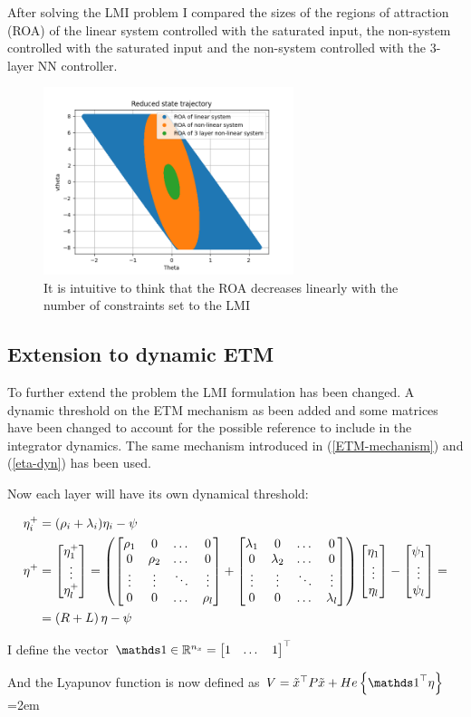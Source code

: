 \documentclass{article}
\begin{document}
After solving the LMI problem I compared the sizes of the regions of attraction (ROA) of the linear system controlled with the saturated input, the non-system controlled with the saturated input and the non-system controlled with the 3-layer NN controller. 


\begin{figure}[H]
    \centering
    \includegraphics[width=0.65\textwidth]{ROA_comparison}
    \caption{It is intuitive to think that the ROA decreases linearly with the number of constraints set to the LMI}
\end{figure}

\subsection*{Extension to dynamic ETM}
To further extend the problem the LMI formulation has been changed. A dynamic threshold on the ETM mechanism as been added and some matrices have been changed to account for the possible reference to include in the integrator dynamics. 
The same mechanism introduced in (\ref{ETM-mechanism}) and (\ref{eta-dyn}) has been used. 

Now each layer will have its own dynamical threshold:

\begin{align*}
  \eta_i^{+} &= (\rho_{i} + \lambda_{i}) \eta_i - \psi \\
  \eta^{+} &= \left[\begin{matrix}
    \eta_1^{+} \\
    \vdots \\
    \eta_l^{+}
  \end{matrix}\right] = \left( \left[\begin{matrix}
    \rho_1 & 0 & \dots & 0\\
    0 & \rho_2 & \dots & 0\\
    \vdots & \vdots & \ddots & \vdots\\
    0 & 0 & \dots & \rho_l
  \end{matrix}\right] + \left[\begin{matrix}
    \lambda_1 & 0 & \dots & 0\\
    0 & \lambda_2 & \dots & 0\\
    \vdots & \vdots & \ddots & \vdots\\
    0 & 0 & \dots & \lambda_l
  \end{matrix}\right]\right) \left[\begin{matrix}
    \eta_1 \\
    \vdots \\
    \eta_l
  \end{matrix}\right] - \left[\begin{matrix}
    \psi_1 \\
    \vdots \\
    \psi_l
  \end{matrix}\right] = \\
  &= \left( R + L \right) \eta - \psi
\end{align*}

I define the vector $\one \in \RR^{n_{x}} = \bmx{1 & \dots & 1}\tr$

And the Lyapunov function is now defined as $V = \tilde{x}\tr P \tilde{x} + He \left\{ \one\tr \eta \right\}$
\pagebreak
\emergencystretch=2em %
\printbibliography
\end{document}
